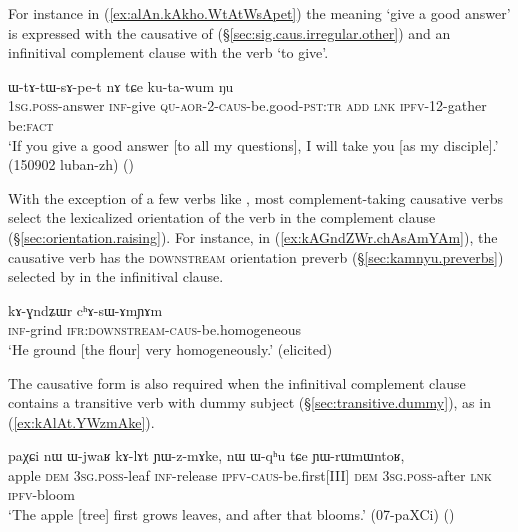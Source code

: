 For instance in (\ref{ex:alAn.kAkho.WtAtWsApet}) the meaning `give a good answer' is expressed with the causative  of  (§\ref{sec:sig.caus.irregular.other}) and an infinitival complement clause with the verb  `to give'.

\begin{exe}
\ex \label{ex:alAn.kAkho.WtAtWsApet}
 ɯ-tɤ-tɯ-sɤ-pe-t nɤ tɕe ku-ta-wum ŋu \\
\textsc{1sg}.\textsc{poss}-answer \textsc{inf}-give \textsc{qu}-\textsc{aor}-2-\textsc{caus}-be.good-\textsc{pst}:\textsc{tr} \textsc{add} \textsc{lnk} \textsc{ipfv}-1\fl{}2-gather be:\textsc{fact} \\
\glt `If you give a good answer [to all my questions], I will take you [as my disciple].' (150902 luban-zh)
()
\end{exe}

With the exception of a few verbs like , most com\-ple\-ment-taking causative verbs select the lexicalized orientation of the verb in the complement clause (§\ref{sec:orientation.raising}). For instance, in (\ref{ex:kAGndZWr.chAsAmYAm}), the causative verb  has the \textsc{downstream} orientation preverb  (§\ref{sec:kamnyu.preverbs}) selected by  in the infinitival clause.

\begin{exe}
\ex \label{ex:kAGndZWr.chAsAmYAm}
\gll kɤ-ɣndʑɯr cʰɤ-sɯ-ɤmɲɤm \\
\textsc{inf}-grind \textsc{ifr}:\textsc{downstream}-\textsc{caus}-be.homogeneous \\
\glt `He ground [the flour] very homogeneously.' (elicited)
\end{exe}

The causative form is also required when the infinitival complement clause contains a transitive verb with dummy subject (§\ref{sec:transitive.dummy}), as in (\ref{ex:kAlAt.YWzmAke}).

\begin{exe}
\ex \label{ex:kAlAt.YWzmAke}
\gll  paχɕi nɯ ɯ-jwaʁ kɤ-lɤt ɲɯ-z-mɤke, nɯ ɯ-qʰu tɕe ɲɯ-rɯmɯntoʁ, \\
apple \textsc{dem} \textsc{3sg}.\textsc{poss}-leaf \textsc{inf}-release \textsc{ipfv}-\textsc{caus}-be.first[III] \textsc{dem} \textsc{3sg}.\textsc{poss}-after \textsc{lnk} \textsc{ipfv}-bloom \\
\glt `The apple [tree] first grows leaves, and after that blooms.' (07-paXCi)
()
\end{exe}



